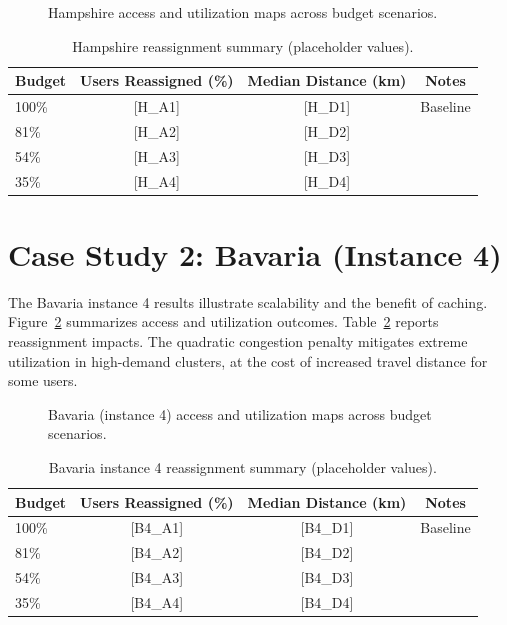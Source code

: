 \documentclass[11pt]{article}
\begin{document}
\begin{figure}[t]
\centering
{}
\caption{Hampshire access and utilization maps across budget scenarios.}
\label{fig:hampshire_maps}
\end{figure}

\begin{table}[t]
\centering
\caption{Hampshire reassignment summary (placeholder values).}
\label{tab:hampshire_reassign}
\begin{tabular}{lccc}
\toprule
Budget & Users Reassigned (\%) & Median Distance (km) & Notes \\
\midrule
100\% & [H\_A1] & [H\_D1] & Baseline \\
81\%  & [H\_A2] & [H\_D2] & \\
54\%  & [H\_A3] & [H\_D3] & \\
35\%  & [H\_A4] & [H\_D4] & \\
\bottomrule
\end{tabular}
\end{table}

\section{Case Study 2: Bavaria (Instance 4)}
The Bavaria instance 4 results illustrate scalability and the benefit of caching. Figure~\ref{fig:bavaria_maps} summarizes access and utilization outcomes. Table~\ref{tab:bavaria_reassign} reports reassignment impacts. The quadratic congestion penalty mitigates extreme utilization in high-demand clusters, at the cost of increased travel distance for some users.

\begin{figure}[t]
\centering
{}
\caption{Bavaria (instance 4) access and utilization maps across budget scenarios.}
\label{fig:bavaria_maps}
\end{figure}

\begin{table}[t]
\centering
\caption{Bavaria instance 4 reassignment summary (placeholder values).}
\label{tab:bavaria_reassign}
\begin{tabular}{lccc}
\toprule
Budget & Users Reassigned (\%) & Median Distance (km) & Notes \\
\midrule
100\% & [B4\_A1] & [B4\_D1] & Baseline \\
81\%  & [B4\_A2] & [B4\_D2] & \\
54\%  & [B4\_A3] & [B4\_D3] & \\
35\%  & [B4\_A4] & [B4\_D4] & \\
\bottomrule
\end{tabular}
\end{table}
\end{document}
